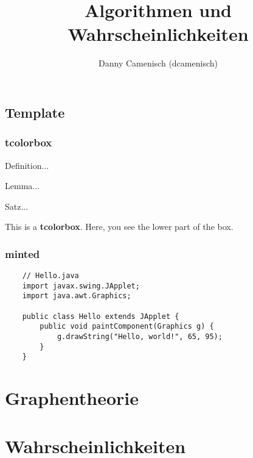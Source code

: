 \documentclass[a4paper]{report}
\title{Algorithmen und Wahrscheinlichkeiten}
\author{Danny Camenisch (dcamenisch)}
\begin{document}
\maketitle
\tableofcontents
\listofalgorithms



\chapter{Template}
\section{tcolorbox}

\begin{definition}
    Definition...
\end{definition}

\begin{lemma}
    Lemma...
\end{lemma}

\begin{satz}
    Satz...
\end{satz}

\begin{tcolorbox}[colback=dcWhite,colframe=dcOrange,title=\textbf{My Heading}]
    This is a \textbf{tcolorbox}.
\tcblower
    Here, you see the lower part of the box.
\end{tcolorbox}

\section{minted}

\begin{verbatim}
    // Hello.java
    import javax.swing.JApplet;
    import java.awt.Graphics;
    
    public class Hello extends JApplet {
        public void paintComponent(Graphics g) {
            g.drawString("Hello, world!", 65, 95);
        }    
    }
\end{verbatim}



\part{Graphentheorie}








\part{Wahrscheinlichkeiten}


\end{document}

